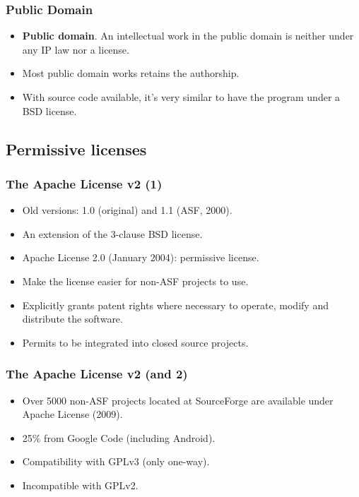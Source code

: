 
\begin{frame}
\frametitle{Public Domain}

\begin{itemize}
\item {\bf Public domain}. An intellectual work in the public domain
  is neither under any IP law nor a license. 
\item Most public domain works retains the authorship. 
\item With source code available, it's very similar to have the program under a BSD license.
\end{itemize}

\end{frame}

  
\subsection{Permissive licenses}

\begin{frame}
\frametitle{The Apache License v2 (1)}

\begin{itemize}
\item Old versions: 1.0 (original) and 1.1 (ASF, 2000).
\item An extension of the 3-clause BSD license.
\item Apache License 2.0 (January 2004): permissive license.
\item Make the license easier for non-ASF projects to use.
\item Explicitly grants patent rights where necessary to operate, modify and distribute the software.
\item Permits to be integrated into closed source projects.
\end{itemize}

\end{frame}


\begin{frame}
\frametitle{The Apache License v2 (and 2)}

\begin{itemize}
\item Over 5000 non-ASF projects located at SourceForge are available under Apache License (2009). 
\item 25\% from Google Code (including Android).
\item Compatibility with GPLv3 (only one-way). 
\item Incompatible with GPLv2.
\end{itemize}

\end{frame}


